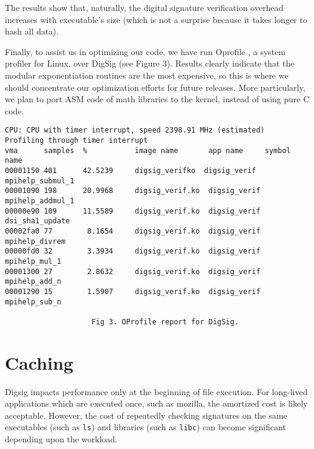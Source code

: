 \documentclass{article}
\begin{document}

The results show that, naturally, the digital signature verification
overhead increases with executable's size (which is not a surprise
because it takes longer to hash all data).

Finally, to assist us in optimizing our code, we have run Oprofile
\cite{OProfile}, a system profiler for Linux, over DigSig (see Figure 3). Results
clearly indicate that the modular exponentiation routines are the most
expensive, so this is where we should concentrate our optimization
efforts for future releases. More particularly, we plan to port ASM
code of math libraries to the kernel, instead of using pure C code.

\begin{verbatim} 
CPU: CPU with timer interrupt, speed 2398.91 MHz (estimated)
Profiling through timer interrupt
vma      samples  %           image name       app name     symbol name
00001150 401      42.5239     digsig_verifko  digsig_verif mpihelp_submul_1
00001090 198      20.9968     digsig_verif.ko  digsig_verif mpihelp_addmul_1
00000e90 109      11.5589     digsig_verif.ko  digsig_verif dsi_sha1_update
00002fa0 77        8.1654     digsig_verif.ko  digsig_verif mpihelp_divrem
00000fd0 32        3.3934     digsig_verif.ko  digsig_verif mpihelp_mul_1
00001300 27        2.8632     digsig_verif.ko  digsig_verif mpihelp_add_n
00001290 15        1.5907     digsig_verif.ko  digsig_verif mpihelp_sub_n

                    Fig 3. OProfile report for DigSig. 
\end{verbatim} 

\section{Caching}

Digsig impacts performance only at the beginning of file execution.  For
long-lived applications which are executed once, such as mozilla, the
amortized cost is likely acceptable.  However, the cost of repeatedly
checking signatures on the same executables (such as {\tt ls}) and
libraries (such as {\tt libc}) can become significant depending upon
the workload.
\end{document}
